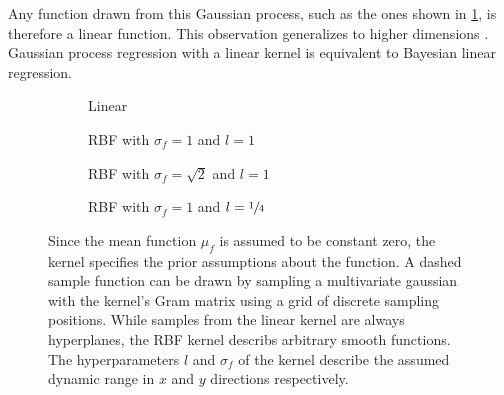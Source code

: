 Any function drawn from this Gaussian process, such as the ones shown in \cref{fig:gp_samples:linear}, is therefore a linear function.
This observation generalizes to higher dimensions \cite{rasmussen_gaussian_2006}.
Gaussian process regression with a linear kernel is equivalent to Bayesian linear regression.
\begin{figure}[p]
    \centering
    \begin{subfigure}[b]{\subfigurewidth}
        \centering
        \caption{Linear}
        \label{fig:gp_samples:linear}
    \end{subfigure}
    \begin{subfigure}[b]{\subfigurewidth}
        \centering
        \caption{RBF with $\sigma_f = 1$ and $l=1$}
        \label{fig:gp_samples:rbf_normal}
    \end{subfigure}

    \vspace{4ex}

    \begin{subfigure}[b]{\subfigurewidth}
        \centering
        \caption{RBF with $\sigma_f = \sqrt{2}$ and $l=1$}
        \label{fig:gp_samples:rbf_noisy}
    \end{subfigure}
    \begin{subfigure}[b]{\subfigurewidth}
        \centering
        \caption{RBF with $\sigma_f = 1$ and $l=\sfrac{1}{4}$}
        \label{fig:gp_samples:rbf_lengthscale}
    \end{subfigure}
    \caption[Samples from GP priors]{
        Since the mean function $\mu_f$ is assumed to be constant zero, the kernel specifies the prior assumptions about the function.
        A dashed sample function can be drawn by sampling a multivariate gaussian with the kernel's Gram matrix using a grid of discrete sampling positions.
        While samples from the linear kernel are always hyperplanes, the RBF kernel describs arbitrary smooth functions.
        The hyperparameters $l$ and $\sigma_f$ of the kernel describe the assumed dynamic range in $x$ and $y$ directions respectively.
    }
    \label{fig:gp_samples}
\end{figure}

